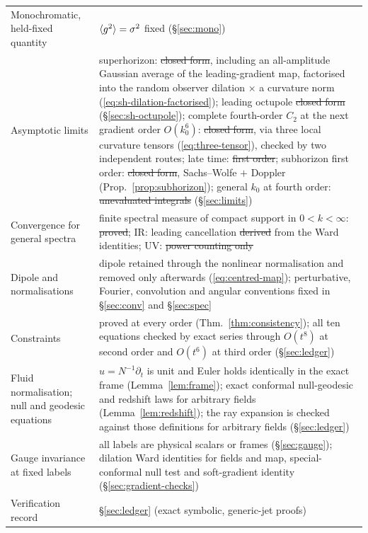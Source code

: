 \begin{center}
\begin{longtable}{p{6.4cm}p{8.6cm}}
Monochromatic, held-fixed quantity & $\langle g^2\rangle=\sigma^2$ fixed (\S\ref{sec:mono}) \\
Asymptotic limits & superhorizon: \st{closed form}, including an all-amplitude Gaussian average of the leading-gradient map, factorised into the random observer dilation $\times$ a curvature norm (\eqref{eq:sh-dilation-factorised}); leading octupole \st{closed form} (\S\ref{sec:sh-octupole}); complete fourth-order $C_2$ at the next gradient order $O(k_0^6)$: \st{closed form}, via three local curvature tensors (\eqref{eq:three-tensor}), checked by two independent routes; late time: \st{first order}; subhorizon first order: \st{closed form}, Sachs--Wolfe $+$ Doppler (Prop.~\ref{prop:subhorizon}); general $k_0$ at fourth order: \st{unevaluated integrals} (\S\ref{sec:limits}) \\
Convergence for general spectra & finite spectral measure of compact support in $0<k<\infty$: \st{proved}; IR: leading cancellation \st{derived} from the Ward identities; UV: \st{power counting only} \\
Dipole and normalisations & dipole retained through the nonlinear normalisation and removed only afterwards (\eqref{eq:centred-map}); perturbative, Fourier, convolution and angular conventions fixed in \S\ref{sec:conv} and \S\ref{sec:spec} \\
Constraints & proved at every order (Thm.~\ref{thm:consistency}); all ten equations checked by exact series through $O(t^8)$ at second order and $O(t^6)$ at third order (\S\ref{sec:ledger}) \\
Fluid normalisation; null and geodesic equations & $u=N^{-1}\partial_t$ is unit and Euler holds identically in the exact frame (Lemma~\ref{lem:frame}); exact conformal null-geodesic and redshift laws for arbitrary fields (Lemma~\ref{lem:redshift}); the ray expansion is checked against those definitions for arbitrary fields (\S\ref{sec:ledger}) \\
Gauge invariance at fixed labels & all labels are physical scalars or frames (\S\ref{sec:gauge}); dilation Ward identities for fields and map, special-conformal null test and soft-gradient identity (\S\ref{sec:gradient-checks}) \\
Verification record & \S\ref{sec:ledger} (exact symbolic, generic-jet proofs) \\
\bottomrule
\end{longtable}
\end{center}

